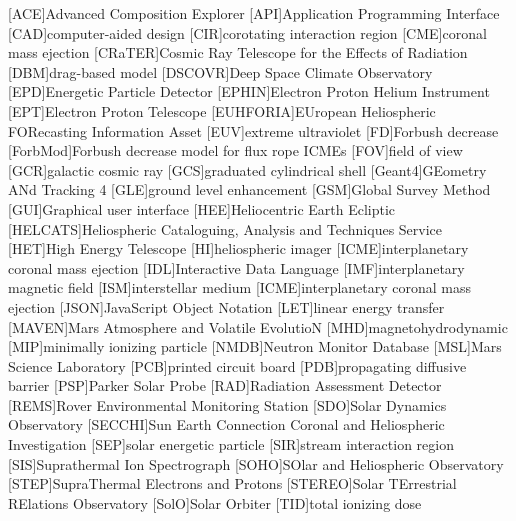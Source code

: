 	\begin{acronym}\itemsep0pt
	[ACE]{Advanced Composition Explorer}
	[API]{Application Programming Interface}
	[CAD]{computer-aided design}
	[CIR]{corotating interaction region}
	[CME]{coronal mass ejection}
	[CRaTER]{Cosmic Ray Telescope for the Effects of Radiation}
	[DBM]{drag-based model}
	[DSCOVR]{Deep Space Climate Observatory}
	[EPD]{Energetic Particle Detector}
	[EPHIN]{Electron Proton Helium Instrument}
	[EPT]{Electron Proton Telescope}
    [EUHFORIA]{EUropean Heliospheric FORecasting Information Asset}
	[EUV]{extreme ultraviolet}
	[FD]{Forbush decrease}
	[ForbMod]{Forbush decrease model for flux rope ICMEs}
	[FOV]{field of view}
	[GCR]{galactic cosmic ray}
	[GCS]{graduated cylindrical shell}
	[Geant4]{GEometry ANd Tracking 4}
	[GLE]{ground level enhancement}
	[GSM]{Global Survey Method}
	[GUI]{Graphical user interface}
	[HEE]{Heliocentric Earth Ecliptic}
	[HELCATS]{Heliospheric Cataloguing, Analysis and Techniques Service}
	[HET]{High Energy Telescope}
	[HI]{heliospheric imager}
	[ICME]{interplanetary coronal mass ejection}
	[IDL]{Interactive Data Language}
	[IMF]{interplanetary magnetic field}
    [ISM]{interstellar medium}
	[ICME]{interplanetary coronal mass ejection}
	[JSON]{JavaScript Object Notation}
	[LET]{linear energy transfer}
	[MAVEN]{Mars Atmosphere and Volatile EvolutioN}
	[MHD]{magnetohydrodynamic}
	[MIP]{minimally ionizing particle}
	[NMDB]{Neutron Monitor Database}
	[MSL]{Mars Science Laboratory}
	[PCB]{printed circuit board}
	[PDB]{propagating diffusive barrier}
	[PSP]{Parker Solar Probe}
	[RAD]{Radiation Assessment Detector}
	[REMS]{Rover Environmental Monitoring Station}
	[SDO]{Solar Dynamics Observatory}
    [SECCHI]{Sun Earth Connection Coronal and Heliospheric Investigation}
	[SEP]{solar energetic particle}
	[SIR]{stream interaction region}
	[SIS]{Suprathermal Ion Spectrograph}
	[SOHO]{SOlar and Heliospheric Observatory}
	[STEP]{SupraThermal Electrons and Protons}
	[STEREO]{Solar TErrestrial RElations Observatory}
	[SolO]{Solar Orbiter}
	[TID]{total ionizing dose}
	\end{acronym}
	

\endgroup

\cleardoublepage